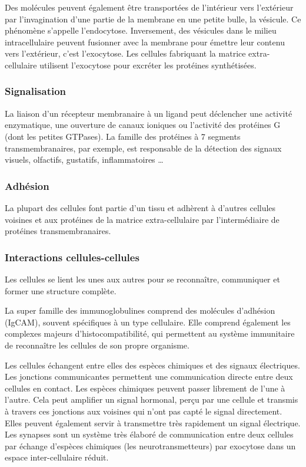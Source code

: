 \documentclass{report}
\begin{document}
Des molécules peuvent également être transportées de l'intérieur vers l'extérieur par l'invagination d'une partie de la membrane en une petite bulle, la vésicule. Ce phénomène s'appelle l'endocytose. Inversement, des vésicules dans le milieu intracellulaire peuvent fusionner avec la membrane pour émettre leur contenu vers l'extérieur, c'est l'exocytose. Les cellules fabriquant la matrice extra-cellulaire utilisent l'exocytose pour excréter les protéines synthétisées. 

\subsubsection{Signalisation}

La liaison d'un récepteur membranaire à un ligand peut déclencher une activité enzymatique, une ouverture de canaux ioniques ou l'activité des protéines G (dont les petites GTPases). 
La famille des protéines à 7 segments transmembranaires, par exemple, est responsable de la détection des signaux visuels, olfactifs, gustatifs, inflammatoires \dots

\subsubsection{Adhésion}

La plupart des cellules font partie d'un tissu et adhèrent à d'autres cellules voisines et aux protéines de la matrice extra-cellulaire par l'intermédiaire de protéines transmembranaires. 

\subsubsection{Interactions cellules-cellules}

Les cellules se lient les unes aux autres pour se reconnaître, communiquer et former une structure complète. 

La super famille des immunoglobulines comprend des molécules d'adhésion (IgCAM), souvent spécifiques à un type cellulaire. Elle comprend également les complexes majeurs d'histocompatibilité, qui permettent au système immunitaire de reconnaître les cellules de son propre organisme. 

Les cellules échangent entre elles des espèces chimiques et des signaux électriques. 
Les jonctions communicantes permettent une communication directe entre deux cellules en contact. Les espèces chimiques peuvent passer librement de l'une à l'autre. Cela peut amplifier un signal hormonal, perçu par une cellule et transmis à travers ces jonctions aux voisines qui n'ont pas capté le signal directement. Elles peuvent également servir à transmettre très rapidement un signal électrique. 
Les synapses sont un système très élaboré de communication entre deux cellules par échange d'espèces chimiques (les neurotransmetteurs) par exocytose dans un espace inter-cellulaire réduit. 
\end{document}
